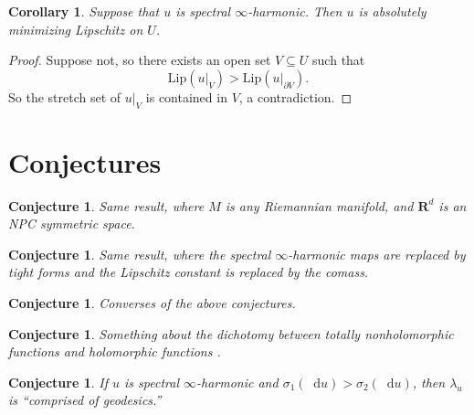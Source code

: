\documentclass[reqno,11pt]{amsart}
\newcommand{\RR}{\mathbf{R}}
\newcommand*\dif{\mathop{}\!\mathrm{d}}
\newcommand{\Lip}{\mathrm{Lip}}
\newtheorem{corollary}[theorem]{Corollary}
\newtheorem{conjecture}[theorem]{Conjecture}
\theoremstyle{definition}
\numberwithin{equation}{section}
\begin{document}
\begin{corollary}
Suppose that $u$ is spectral $\infty$-harmonic.
Then $u$ is absolutely minimizing Lipschitz on $U$.
\end{corollary}
\begin{proof}
Suppose not, so there exists an open set $V \subseteq U$ such that 
$$\Lip(u|_V) > \Lip(u|_{\partial V}).$$
So the stretch set of $u|_V$ is contained in $V$, a contradiction.
\end{proof}

\section{Conjectures}
\begin{conjecture}
Same result, where $M$ is any Riemannian manifold, and $\RR^d$ is an NPC symmetric space.
\end{conjecture}

\begin{conjecture}
Same result, where the spectral $\infty$-harmonic maps are replaced by tight forms and the Lipschitz constant is replaced by the comass.
\end{conjecture}

\begin{conjecture}
Converses of the above conjectures.
\end{conjecture}

\begin{conjecture}
Something about the dichotomy between totally nonholomorphic functions and holomorphic functions \cite{Sheffield2010VectorvaluedOL}.
\end{conjecture}

\begin{conjecture}
If $u$ is spectral $\infty$-harmonic and $\sigma_1(\dif u) > \sigma_2(\dif u)$, then $\lambda_u$ is ``comprised of geodesics.''
\end{conjecture}


\printbibliography
\end{document}
